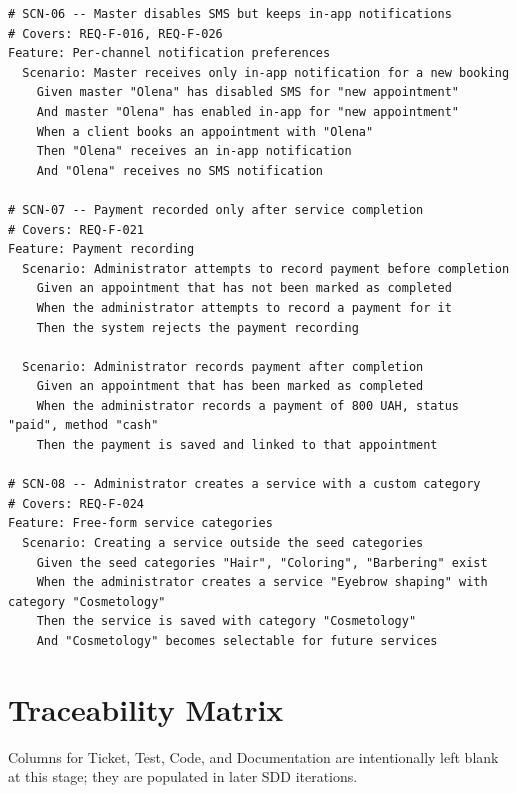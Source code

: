 \documentclass[11pt,a4paper]{article}
\begin{document}
\begin{lstlisting}
# SCN-06 -- Master disables SMS but keeps in-app notifications
# Covers: REQ-F-016, REQ-F-026
Feature: Per-channel notification preferences
  Scenario: Master receives only in-app notification for a new booking
    Given master "Olena" has disabled SMS for "new appointment"
    And master "Olena" has enabled in-app for "new appointment"
    When a client books an appointment with "Olena"
    Then "Olena" receives an in-app notification
    And "Olena" receives no SMS notification

# SCN-07 -- Payment recorded only after service completion
# Covers: REQ-F-021
Feature: Payment recording
  Scenario: Administrator attempts to record payment before completion
    Given an appointment that has not been marked as completed
    When the administrator attempts to record a payment for it
    Then the system rejects the payment recording

  Scenario: Administrator records payment after completion
    Given an appointment that has been marked as completed
    When the administrator records a payment of 800 UAH, status "paid", method "cash"
    Then the payment is saved and linked to that appointment

# SCN-08 -- Administrator creates a service with a custom category
# Covers: REQ-F-024
Feature: Free-form service categories
  Scenario: Creating a service outside the seed categories
    Given the seed categories "Hair", "Coloring", "Barbering" exist
    When the administrator creates a service "Eyebrow shaping" with category "Cosmetology"
    Then the service is saved with category "Cosmetology"
    And "Cosmetology" becomes selectable for future services
\end{lstlisting}

\section{Traceability Matrix}
\label{sec:traceability}

Columns for Ticket, Test, Code, and Documentation are intentionally left
blank at this stage; they are populated in later SDD iterations.
\end{document}
